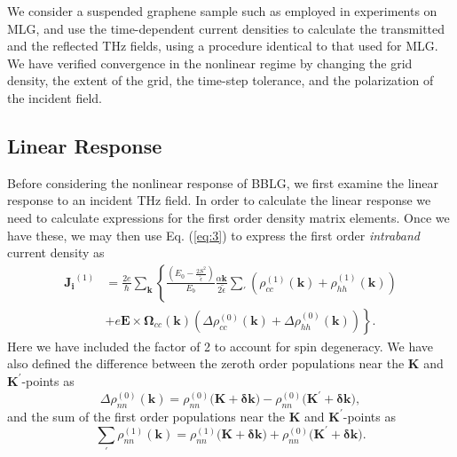 \documentclass[twocolumn,secnumarabic,amssymb, nobibnotes, aps, prd, superscriptaddress]{revtex4-1}
\begin{document}
We consider a suspended graphene sample such as employed in experiments on MLG\cite{paul2013high}, and use the time-dependent current densities to calculate the transmitted and the reflected THz fields, using a procedure identical to that used for MLG\cite{al2015nonperturbative}. We have verified convergence in the nonlinear regime by changing the grid density, the extent of the grid, the time-step tolerance, and the polarization of the incident field.

\subsection{Linear Response}
Before considering the nonlinear response of BBLG, we first examine the linear response to an incident THz field. In order to calculate the linear response we need to calculate expressions for the first order density matrix elements. Once we have these, we may then use Eq. (\ref{eq:3}) to express the first order \textit{intraband} current density as
\begin{equation}
\begin{aligned} \mathbf{J_{i}}^{(1)} & =\frac{2e}{\hbar}\sum_{\mathbf{k}}\left\{ \frac{\left(E_{0}-\frac{2S^{2}}{\tilde{\epsilon}}\right)}{E_{b}}\frac{\alpha\mathbf{k}}{2\tilde{\epsilon}}\sum_{\prime}\left(\rho_{cc}^{(1)}(\mathbf{k})+\rho_{hh}^{(1)}(\mathbf{k})\right)\right.\\
 & +\left.e\mathbf{E}\times\mathbf{\Omega}_{cc}(\mathbf{k})\left(\Delta\rho_{cc}^{(0)}(\mathbf{k})+\Delta\rho_{hh}^{(0)}(\mathbf{k})\right)\right\}. 
\end{aligned}\label{eq:intra1}
\end{equation}
Here we have included the factor of 2 to account for spin degeneracy. We have also defined the difference between the zeroth order populations near the $\mathbf{K}$ and $\mathbf{K}^{\prime}$-points as
\begin{equation}
\Delta\rho_{nn}^{(0)}(\mathbf{k})=\rho_{nn}^{(0)}(\mathbf{\mathbf{K+}\mathbf{\delta k})}-\rho_{nn}^{(0)}(\mathbf{\mathbf{K^{\prime}+}\mathbf{\delta k})}\label{eq:diff},
\end{equation}
and the sum of the first order populations near the $\mathbf{K}$ and $\mathbf{K}^{\prime}$-points as
\begin{equation}
\sum_{\prime}\rho_{nn}^{(1)}(
\mathbf{k})=\rho_{nn}^{(1)}(\mathbf{\mathbf{K+}\mathbf{\delta k})}+\rho_{nn}^{(0)}(\mathbf{\mathbf{K^{\prime}+}\mathbf{\delta k})}\label{eq:sum}.
\end{equation}
\end{document}
